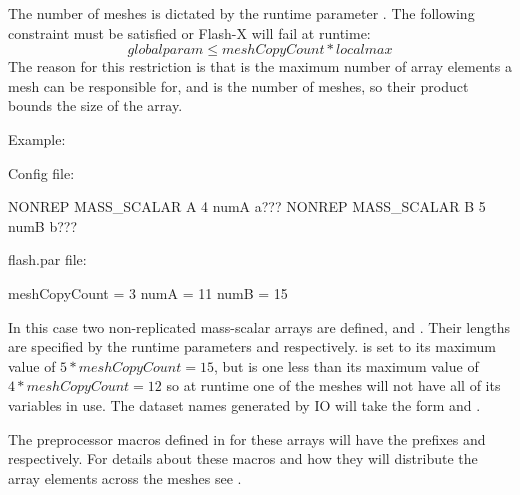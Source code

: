 \begin{itemize}
The number of meshes is dictated by the runtime parameter .  The
following constraint must be satisfied or Flash-X will fail at runtime:
\[globalparam \le meshCopyCount * localmax\]
The reason for this restriction is that  is the maximum number of
array elements a mesh can be responsible for, and  is the number of
meshes, so their product bounds the size of the array.

Example:

Config file:
\begin{fcodeseg}
NONREP MASS_SCALAR A 4 numA a???
NONREP MASS_SCALAR B 5 numB b???
\end{fcodeseg}

flash.par file:
\begin{fcodeseg}
meshCopyCount = 3
numA = 11
numB = 15
\end{fcodeseg}

In this case two non-replicated mass-scalar arrays are defined,  and
.  Their lengths are specified by the runtime parameters  and
 respectively.   is set to its maximum value of $5*meshCopyCount=15$,
but  is one less than its maximum value of $4*meshCopyCount=12$ so at runtime
one of the meshes will not have all of its  variables in use.  The
dataset names generated by IO will take the form  and
.

The preprocessor macros defined in  for these arrays will have the
prefixes  and  respectively.  For details about these macros and
how they will distribute the array elements across the meshes see .


\end{itemize}

